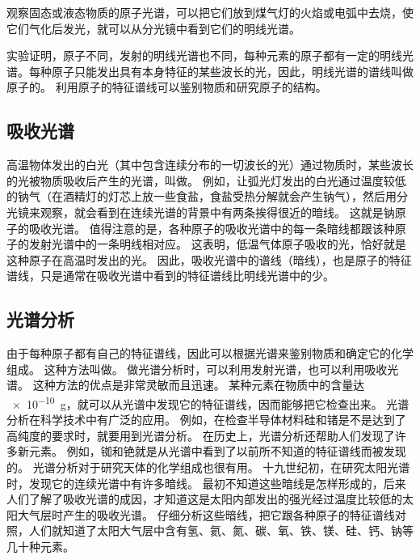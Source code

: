 观察固态或液态物质的原子光谱，可以把它们放到煤气灯的火焰或电弧中去烧，使它们气化后发光，就可以从分光镜中看到它们的明线光谱。

实验证明，原子不同，发射的明线光谱也不同，每种元素的原子都有一定的明线光谱。每种原子只能发出具有本身特征的某些波长的光，因此，明线光谱的谱线叫做原子的。
利用原子的特征谱线可以鉴别物质和研究原子的结构。

\subsection{吸收光谱}
高温物体发出的白光（其中包含连续分布的一切波长的光）通过物质时，某些波长的光被物质吸收后产生的光谱，叫做。
例如，让弧光灯发出的白光通过温度较低的钠气（在酒精灯的灯芯上放一些食盐，食盐受热分解就会产生钠气），然后用分光镜来观察，就会看到在连续光谱的背景中有两条挨得很近的暗线。
这就是钠原子的吸收光谱。
值得注意的是，各种原子的吸收光谱中的每一条暗线都跟该种原子的发射光谱中的一条明线相对应。
这表明，低温气体原子吸收的光，恰好就是这种原子在高温时发出的光。
因此，吸收光谱中的谱线（暗线），也是原子的特征谱线，只是通常在吸收光谱中看到的特征谱线比明线光谱中的少。

\subsection{光谱分析}
由于每种原子都有自己的特征谱线，因此可以根据光谱来鉴别物质和确定它的化学组成。
这种方法叫做。
做光谱分析时，可以利用发射光谱，也可以利用吸收光谱。
这种方法的优点是非常灵敏而且迅速。
某种元素在物质中的含量达 \qty{e-10}{g}，就可以从光谱中发现它的特征谱线，因而能够把它检查出来。
光谱分析在科学技术中有广泛的应用。
例如，在检查半导体材料硅和锗是不是达到了高纯度的要求时，就要用到光谱分析。
在历史上，光谱分析还帮助人们发现了许多新元素。
例如，铷和铯就是从光谱中看到了以前所不知道的特征谱线而被发现的。
光谱分析对于研究天体的化学组成也很有用。
十九世纪初，在研究太阳光谱时，发现它的连续光谱中有许多暗线。
最初不知道这些暗线是怎样形成的，后来人们了解了吸收光谱的成因，才知道这是太阳内部发出的强光经过温度比较低的太阳大气层时产生的吸收光谱。
仔细分析这些暗线，把它跟各种原子的特征谱线对照，人们就知道了太阳大气层中含有氢、氦、氮、碳、氧、铁、镁、硅、钙、钠等几十种元素。

